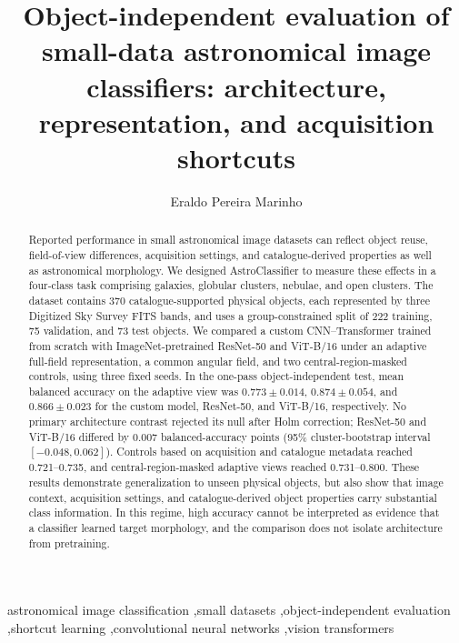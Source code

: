 \documentclass[preprint,12pt,authoryear]{elsarticle}
\newcommand{\dataset}{AstroClassifier}
\begin{document}
\begin{frontmatter}

\title{Object-independent evaluation of small-data astronomical image classifiers:
architecture, representation, and acquisition shortcuts}

\author[unesp]{Eraldo Pereira Marinho}

\begin{abstract}
Reported performance in small astronomical image datasets can reflect object reuse,
field-of-view differences, acquisition settings, and catalogue-derived properties as well as astronomical
morphology. We designed \dataset{} to measure these effects in a four-class task
comprising galaxies, globular clusters, nebulae, and open clusters. The dataset
contains 370 catalogue-supported physical objects, each represented by three
Digitized Sky Survey FITS bands, and uses a group-constrained split of 222 training,
75 validation, and 73 test objects. We compared a custom CNN--Transformer trained
from scratch with ImageNet-pretrained ResNet-50 and ViT-B/16 under an adaptive
full-field representation, a common angular field, and two central-region-masked
controls, using three fixed seeds. In the one-pass object-independent test, mean
balanced accuracy on the adaptive view was $0.773\pm0.014$, $0.874\pm0.054$, and
$0.866\pm0.023$ for the custom model, ResNet-50, and ViT-B/16, respectively. No
primary architecture contrast rejected its null after Holm correction; ResNet-50
and ViT-B/16 differed by 0.007 balanced-accuracy points (95\% cluster-bootstrap
interval $[-0.048,0.062]$). Controls based on acquisition and catalogue metadata
reached 0.721--0.735, and central-region-masked adaptive views reached 0.731--0.800.
These results demonstrate generalization to unseen physical objects, but also show
that image context, acquisition settings, and catalogue-derived object properties
carry substantial class information. In this regime, high accuracy
cannot be interpreted as evidence that a classifier learned target morphology, and
the comparison does not isolate architecture from pretraining.
\end{abstract}

\begin{keyword}
astronomical image classification \sep small datasets \sep object-independent
evaluation \sep shortcut learning \sep convolutional neural networks \sep vision
transformers
\end{keyword}

\end{frontmatter}
\end{document}
